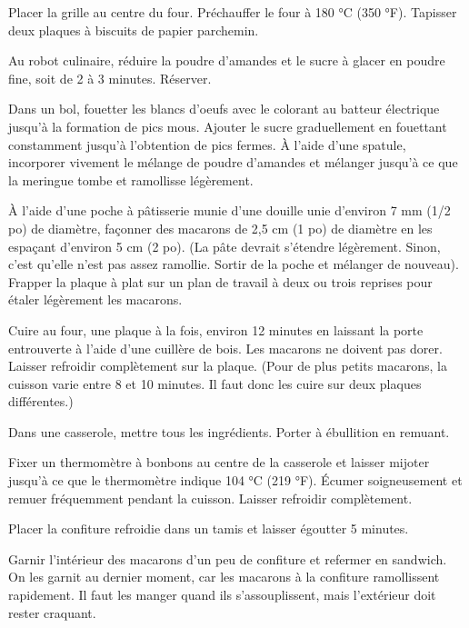 \begin{steps}
    \item[] 
    \item Placer la grille au centre du four. Préchauffer le four à 180 °C (350 °F). Tapisser deux plaques à biscuits de papier parchemin.
    \item Au robot culinaire, réduire la poudre d’amandes et le sucre à glacer en poudre fine, soit de 2 à 3 minutes. Réserver.
    \item Dans un bol, fouetter les blancs d’oeufs avec le colorant au batteur électrique jusqu’à la formation de pics mous. Ajouter le sucre graduellement en fouettant constamment jusqu’à l’obtention de pics fermes. À l’aide d’une spatule, incorporer vivement le mélange de poudre d’amandes et mélanger jusqu’à ce que la meringue tombe et ramollisse légèrement.
    \item À l’aide d’une poche à pâtisserie munie d’une douille unie d’environ 7 mm (1/2 po) de diamètre, façonner des macarons de 2,5 cm (1 po) de diamètre en les espaçant d’environ 5 cm (2 po). (La pâte devrait s’étendre légèrement. Sinon, c’est qu’elle n’est pas assez ramollie. Sortir de la poche et mélanger de nouveau). Frapper la plaque à plat sur un plan de travail à deux ou trois reprises pour étaler légèrement les macarons.
    \item Cuire au four, une plaque à la fois, environ 12 minutes en laissant la porte entrouverte à l’aide d’une cuillère de bois. Les macarons ne doivent pas dorer. Laisser refroidir complètement sur la plaque. (Pour de plus petits macarons, la cuisson varie entre 8 et 10 minutes. Il faut donc les cuire sur deux plaques différentes.)
    \\
    \item[] 
    \item Dans une casserole, mettre tous les ingrédients. Porter à ébullition en remuant.
    \item Fixer un thermomètre à bonbons au centre de la casserole et laisser mijoter jusqu’à ce que le thermomètre indique 104 °C (219 °F). Écumer soigneusement et remuer fréquemment pendant la cuisson. Laisser refroidir complètement.
    \item Placer la confiture refroidie dans un tamis et laisser égoutter 5 minutes.
    \item Garnir l’intérieur des macarons d’un peu de confiture et refermer en sandwich. On les garnit au dernier moment, car les macarons à la confiture ramollissent rapidement. Il faut les manger quand ils s’assouplissent, mais l’extérieur doit rester craquant.
\end{steps}
